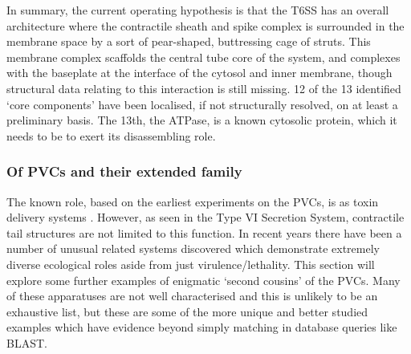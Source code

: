 In summary, the current operating hypothesis is that the T6SS has an overall architecture where the contractile sheath and spike complex is surrounded in the membrane space by a sort of pear-shaped, buttressing cage of struts. This membrane complex scaffolds the central tube core of the system, and complexes with the baseplate at the interface of the cytosol and inner membrane, though structural data relating to this interaction is still missing. 12 of the 13 identified `core components' have been localised, if not structurally resolved, on at least a preliminary basis. The 13th, the ATPase, is a known cytosolic protein, which it needs to be to exert its disassembling role.


\subsubsection{Of PVCs and their extended family}
The known role, based on the earliest experiments on the PVCs, is as toxin delivery systems \citep{Yang2006}. However, as seen in the Type VI Secretion System, contractile tail structures are not limited to this function. In recent years there have been a number of unusual related systems discovered which demonstrate extremely diverse ecological roles aside from just virulence/lethality. This section will explore some further examples of enigmatic `second cousins' of the PVCs. Many of these apparatuses are not well characterised and this is unlikely to be an exhaustive list, but these are some of the more unique and better studied examples which have evidence beyond simply matching in database queries like BLAST.

